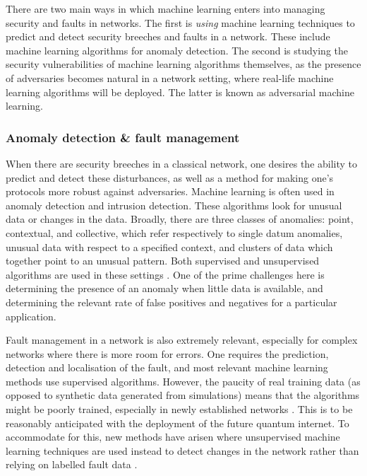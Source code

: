 \documentclass[twocolumn, aps, rmp, amsmath, amssymb, nofootinbib, superscriptaddress, longbibliography, floatfix, table-of-contents, eqsecnum]{revtex4}
\begin{document}
There are two main ways in which machine learning enters into managing security and faults in networks. The first is \textit{using} machine learning techniques to predict and detect security breeches and faults in a network. These include machine learning algorithms for anomaly detection. The second is studying the security vulnerabilities of machine learning algorithms themselves, as the presence of adversaries becomes natural in a network setting, where real-life machine learning algorithms will be deployed. The latter is known as adversarial machine learning.

\subsubsection{Anomaly detection \& fault management}

When there are security breeches in a classical network, one desires the ability to predict and detect these disturbances, as well as a method for making one's protocols more robust against adversaries. Machine learning is often used in anomaly detection and intrusion detection. These algorithms look for unusual data or changes in the data. Broadly, there are three classes of anomalies: point, contextual, and collective, which refer respectively to single datum anomalies, unusual data with respect to a specified context, and clusters of data which together point to an unusual pattern. Both supervised and unsupervised algorithms are used in these settings \cite{bib:thottan2003anomaly, bib:ahmed2007machine}. One of the prime challenges here is determining the presence of an anomaly when little data is available, and determining the relevant rate of false positives and negatives for a particular application.

Fault management in a network is also extremely relevant, especially for complex networks where there is more room for errors. One requires the prediction, detection and localisation of the fault, and most relevant machine learning methods use supervised algorithms. However, the paucity of real training data (as opposed to synthetic data generated from simulations) means that the algorithms might be poorly trained, especially in newly established networks \cite{bib:hood1997proactive, bib:kogeda2006prediction, bib:snow2005assessing}. This is to be reasonably anticipated with the deployment of the future quantum internet. To accommodate for this, new methods have arisen where unsupervised machine learning techniques are used instead to detect changes in the network rather than relying on labelled fault data \cite{bib:hajji2005statistical}.
\end{document}
